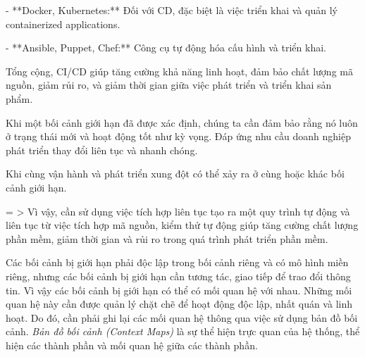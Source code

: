 - **Docker, Kubernetes:** Đối với CD, đặc biệt là việc triển khai và quản lý containerized applications.

- **Ansible, Puppet, Chef:** Công cụ tự động hóa cấu hình và triển khai.

Tổng cộng, CI/CD giúp tăng cường khả năng linh hoạt, đảm bảo chất lượng mã nguồn, giảm rủi ro, và giảm thời gian giữa việc phát triển và triển khai sản phẩm.











Khi một bối cảnh giới hạn đã được xác định, chúng ta cần đảm bảo rằng nó luôn ở trạng thái mới và hoạt động tốt như kỳ vọng. Đáp ứng nhu cầu doanh nghiệp phát triển thay đổi liên tục và nhanh chóng.

Khi cùng vận hành và phát triển xung đột có thể xảy ra ở cùng hoặc khác bối cảnh giới hạn.

= > Vì vậy, cần sử dụng việc tích hợp liên tục tạo ra một quy trình tự động và liên tục từ việc tích hợp mã nguồn, kiểm thử tự động giúp tăng cường chất lượng phần mềm, giảm thời gian và rủi ro trong quá trình phát triển phần mềm.








Các bối cảnh bị giới hạn phải độc lập trong bối cảnh riêng và có mô hình miền riêng, nhưng các bối cảnh bị giới hạn cần tương tác, giao tiếp để trao đổi thông tin. Vì vậy các bối cảnh bị giới hạn có thể có mối quan hệ với nhau. Những mối quan hệ này cần được quản lý chặt chẽ để hoạt động độc lập, nhất quán và linh hoạt. Do đó, cần phải ghi lại các mối quan hệ thông qua việc sử dụng bản đồ bối cảnh. \emph{Bản đồ bối cảnh (Context Maps)} là sự thể hiện trực quan của hệ thống, thể hiện các thành phần và mối quan hệ giữa các thành phần.

